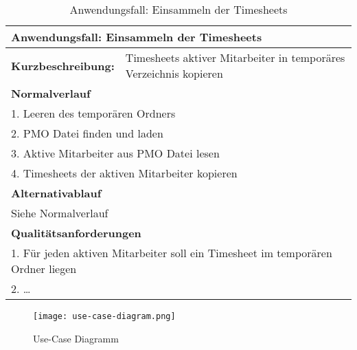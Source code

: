 \begin{table}[H]
    \begin{tabular}[H]{|l|l|}
        \hline
        \multicolumn{2}{|l|}{\textbf{Anwendungsfall:} Einsammeln der Timesheets} \\
        \hline
        \textbf{Kurzbeschreibung:} & Timesheets aktiver Mitarbeiter in temporäres Verzeichnis kopieren \\
        \hline
        \multicolumn{2}{|l|}{\textbf{Normalverlauf}} \\
        \hline
        \multicolumn{2}{|l|}{1. Leeren des temporären Ordners} \\
        \multicolumn{2}{|l|}{2. PMO Datei finden und laden} \\
        \multicolumn{2}{|l|}{3. Aktive Mitarbeiter aus PMO Datei lesen} \\
        \multicolumn{2}{|l|}{4. Timesheets der aktiven Mitarbeiter kopieren} \\
        \hline
        \multicolumn{2}{|l|}{\textbf{Alternativablauf}} \\
        \hline
        \multicolumn{2}{|l|}{Siehe Normalverlauf} \\
        \multicolumn{2}{|l|}{\textbf{Qualitätsanforderungen}} \\
        \hline
        \multicolumn{2}{|l|}{1. Für jeden aktiven Mitarbeiter soll ein Timesheet im temporären Ordner liegen} \\
        \multicolumn{2}{|l|}{2. \dots} \\
        \hline
    \end{tabular}
    \caption{Anwendungsfall: Einsammeln der Timesheets}
    \label{tab:use-case-analyse-timesheets}
\end{table}

\begin{figure}[H]
    \centering
    \texttt{[image: use-case-diagram.png]}
    \caption{Use-Case Diagramm}
    \label{fig:use-case-diagram}
\end{figure}



